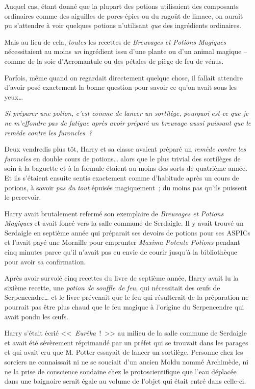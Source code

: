 Auquel cas, étant donné que la plupart des potions utilisaient des composants ordinaires comme des aiguilles de porcs-épics ou du ragoût de limace, on aurait pu s'attendre à voir quelques potions n'utilisant \emph{que} des ingrédients ordinaires.

Mais au lieu de cela, \emph{toutes} les recettes de \emph{Breuvages et Potions Magiques} nécessitaient au moins \emph{un} ingrédient issu d'une plante ou d'un animal magique -- comme de la soie d'Acromantule ou des pétales de piège de feu de vénus.

Parfois, même quand on regardait directement quelque chose, il fallait attendre d'avoir posé exactement la bonne question pour savoir ce qu'on avait sous les yeux…

\emph{Si préparer une potion, c'est comme de lancer un sortilège, pourquoi est-ce que je ne m'effondre pas de fatigue après avoir préparé un breuvage aussi puissant que le remède contre les furoncles~?}

Deux vendredis plus tôt, Harry et sa classe avaient préparé un \emph{remède contre les furoncles} en double cours de potions… alors que le plus trivial des sortilèges de soin à la baguette et à la formule étaient au moins des sorts de quatrième année. Et ils s'étaient ensuite sentis exactement comme d'habitude après un cours de potions, à savoir \emph{pas du tout} épuisés magiquement~; du moins pas qu'ils puissent le percevoir.

Harry avait brutalement refermé son exemplaire de \emph{Breuvages et Potions Magiques} et avait foncé vers la salle commune de Serdaigle. Il y avait trouvé un Serdaigle en septième année qui préparait ses devoirs de potions pour ses ASPICs et l'avait payé une Mornille pour emprunter \emph{Maxima Potente Potions} pendant cinq minutes parce qu'il n'avait pas eu envie de courir jusqu'à la bibliothèque pour avoir sa confirmation.

Après avoir survolé cinq recettes du livre de septième année, Harry avait lu la sixième recette, une \emph{potion de souffle de feu}, qui nécessitait des œufs de Serpencendre… et le livre prévenait que le feu qui résulterait de la préparation ne pourrait pas être plus chaud que le feu magique à l'origine du Serpencendre qui avait pondu les œufs.

Harry s'était écrié <<~\emph{Eurêka}~!~>> au milieu de la salle commune de Serdaigle et avait été sévèrement réprimandé par un préfet qui se trouvait dans les parages et qui avait cru que M. Potter essayait de lancer un sortilège. Personne chez les sorciers ne connaissait ni ne se souciait d'un ancien Moldu nommé Archimède, ni ne la prise de conscience soudaine chez le protoscientifique que l'eau déplacée dans une baignoire serait égale au volume de l'objet qui était entré dans celle-ci.

